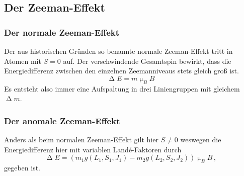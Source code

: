 \subsection{Der Zeeman-Effekt}
\subsubsection{Der normale Zeeman-Effekt}
Der aus historischen Gründen so benannte normale Zeeman-Effekt tritt in Atomen mit $S=0$ auf. Der verschwindende Gesamtspin bewirkt, dass die Energiedifferenz zwischen den einzelnen Zeemanniveaus stets gleich groß ist.
\begin{equation}
  \upDelta E=m\upmu_B B
\end{equation}
Es entsteht also immer eine Aufspaltung in drei Liniengruppen mit gleichem $\upDelta m$.
\subsubsection{Der anomale Zeeman-Effekt}
Anders als beim normalen Zeeman-Effekt gilt hier $S\neq 0$ weswegen die Energiedifferenz hier mit variablen Landé-Faktoren durch
\begin{equation}
\upDelta E = \left(m_1 g(L_1,S_1,J_1)-m_2g(L_2,S_2,J_2)\right)\upmu_B B\,,
\label{eq:lande}
\end{equation}
gegeben ist.
